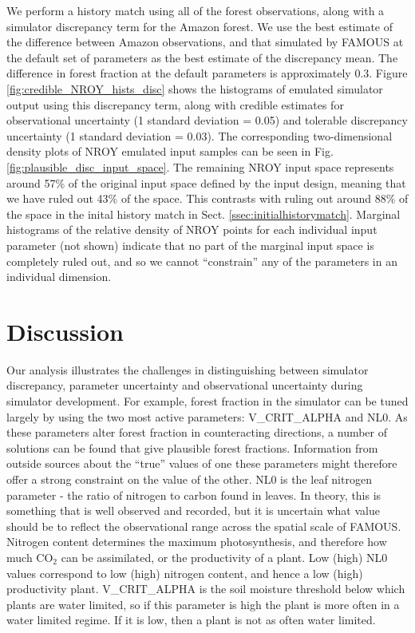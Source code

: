 \documentclass[esd, manuscript]{copernicus}
\begin{document}
We perform a history match using all of the forest observations, along with a simulator discrepancy term for the Amazon forest. We use the best estimate of the difference between Amazon observations, and that simulated by FAMOUS at the default set of parameters as the best estimate of the discrepancy mean. The difference in forest fraction at the default parameters is approximately 0.3. Figure \ref{fig:credible_NROY_hists_disc} shows the histograms of emulated simulator output using this discrepancy term, along with credible estimates for observational uncertainty (1 standard deviation = 0.05) and tolerable discrepancy uncertainty (1 standard deviation = 0.03). The corresponding two-dimensional density plots of NROY emulated input samples can be seen in Fig. \ref{fig:plausible_disc_input_space}. The remaining NROY input space represents around 57\% of the original input space defined by the input design, meaning that we have ruled out 43\% of the space. This contrasts with ruling out around 88\% of the space in the inital history match in Sect. \ref{ssec:initialhistorymatch}. Marginal histograms of the relative density of NROY points for each individual input parameter (not shown) indicate that no part of the marginal input space is completely ruled out, and so we cannot ``constrain'' any of the parameters in an individual dimension.

 


\section{Discussion}\label{sec:discussion}
Our analysis illustrates the challenges in distinguishing between simulator discrepancy, parameter uncertainty and observational uncertainty during simulator development. For example, forest fraction in the simulator can be tuned largely by using the two most active parameters: V\_CRIT\_ALPHA and NL0. As these parameters alter forest fraction in counteracting directions, a number of solutions can be found that give plausible forest fractions. Information from outside sources about the ``true'' values of one these parameters might therefore offer a strong constraint on the value of the other. NL0 is the leaf nitrogen parameter - the ratio of nitrogen to carbon found in leaves. In theory, this is something that is well observed and recorded, but it is uncertain what value should be to reflect the observational range across the spatial scale of FAMOUS. Nitrogen content determines the maximum photosynthesis, and therefore how much CO$_2$ can be assimilated, or the productivity of a plant. Low (high) NL0 values correspond to low (high) nitrogen content, and hence a low (high) productivity plant. V\_CRIT\_ALPHA is the soil moisture threshold below which plants are water limited, so if this parameter is high the plant is more often in a water limited regime. If it is low, then a plant is not as often water limited.
\end{document}
